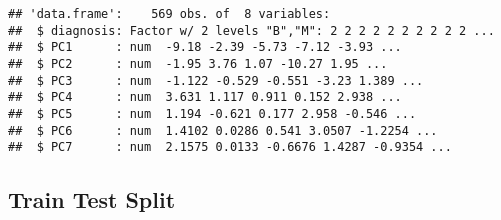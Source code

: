 \documentclass[
]{article}
\newenvironment{Shaded}{\begin{snugshade}}{\end{snugshade}}
\newcommand{\AttributeTok}[1]{\textcolor[rgb]{0.77,0.63,0.00}{#1}}
\newcommand{\CommentTok}[1]{\textcolor[rgb]{0.56,0.35,0.01}{\textit{#1}}}
\newcommand{\ConstantTok}[1]{\textcolor[rgb]{0.00,0.00,0.00}{#1}}
\newcommand{\DecValTok}[1]{\textcolor[rgb]{0.00,0.00,0.81}{#1}}
\newcommand{\FunctionTok}[1]{\textcolor[rgb]{0.00,0.00,0.00}{#1}}
\newcommand{\NormalTok}[1]{#1}
\newcommand{\OtherTok}[1]{\textcolor[rgb]{0.56,0.35,0.01}{#1}}
\newcommand{\SpecialCharTok}[1]{\textcolor[rgb]{0.00,0.00,0.00}{#1}}
\newcommand{\StringTok}[1]{\textcolor[rgb]{0.31,0.60,0.02}{#1}}
\begin{document}
\begin{Shaded}
\end{Shaded}

\begin{verbatim}
## 'data.frame':    569 obs. of  8 variables:
##  $ diagnosis: Factor w/ 2 levels "B","M": 2 2 2 2 2 2 2 2 2 2 ...
##  $ PC1      : num  -9.18 -2.39 -5.73 -7.12 -3.93 ...
##  $ PC2      : num  -1.95 3.76 1.07 -10.27 1.95 ...
##  $ PC3      : num  -1.122 -0.529 -0.551 -3.23 1.389 ...
##  $ PC4      : num  3.631 1.117 0.911 0.152 2.938 ...
##  $ PC5      : num  1.194 -0.621 0.177 2.958 -0.546 ...
##  $ PC6      : num  1.4102 0.0286 0.541 3.0507 -1.2254 ...
##  $ PC7      : num  2.1575 0.0133 -0.6676 1.4287 -0.9354 ...
\end{verbatim}

\hypertarget{train-test-split}{%
\subsection{Train Test Split}\label{train-test-split}}
\end{document}
